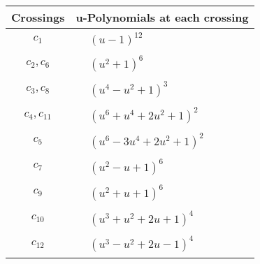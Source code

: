 \documentclass[1p]{elsarticle_modified}
\theoremstyle{definition}
\begin{document}
\begin{tabular}{m{50pt}|m{274pt}}
Crossings & \hspace{64pt}u-Polynomials at each crossing \\
\hline $$\begin{aligned}c_{1}\end{aligned}$$&$\begin{aligned}
&(u-1)^{12}
\end{aligned}$\\
\hline $$\begin{aligned}c_{2},c_{6}\end{aligned}$$&$\begin{aligned}
&(u^2+1)^6
\end{aligned}$\\
\hline $$\begin{aligned}c_{3},c_{8}\end{aligned}$$&$\begin{aligned}
&(u^4- u^2+1)^3
\end{aligned}$\\
\hline $$\begin{aligned}c_{4},c_{11}\end{aligned}$$&$\begin{aligned}
&(u^6+u^4+2 u^2+1)^2
\end{aligned}$\\
\hline $$\begin{aligned}c_{5}\end{aligned}$$&$\begin{aligned}
&(u^6-3 u^4+2 u^2+1)^2
\end{aligned}$\\
\hline $$\begin{aligned}c_{7}\end{aligned}$$&$\begin{aligned}
&(u^2- u+1)^6
\end{aligned}$\\
\hline $$\begin{aligned}c_{9}\end{aligned}$$&$\begin{aligned}
&(u^2+u+1)^6
\end{aligned}$\\
\hline $$\begin{aligned}c_{10}\end{aligned}$$&$\begin{aligned}
&(u^3+u^2+2 u+1)^4
\end{aligned}$\\
\hline $$\begin{aligned}c_{12}\end{aligned}$$&$\begin{aligned}
&(u^3- u^2+2 u-1)^4
\end{aligned}$\\
\hline
\end{tabular}\\~\\
\end{document}
